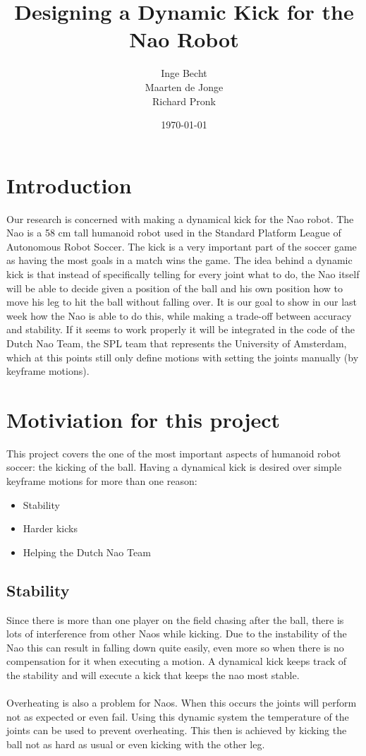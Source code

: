 \documentclass[a4paper]{article}
\begin{document}
\title{Designing a Dynamic Kick for the Nao Robot}
\author{Inge Becht \\ Maarten de Jonge \\ Richard Pronk}
\date{\today}
\maketitle

\section{Introduction}
Our research is concerned with making a dynamical kick for the Nao robot. The
Nao is a 58 cm tall humanoid robot used in the Standard Platform League of
Autonomous Robot Soccer. The kick is a very important part of the soccer game as
having the most goals in a match wins the game. The idea behind a dynamic kick
is that instead of specifically telling for every joint what to do, the Nao
itself will be able to decide given a position of the ball and his own position
how to move his leg to hit the ball without falling over. It is our goal to show
in our last week how the Nao is able to do this, while making a trade-off
between accuracy and stability. If it seems to work properly it will be
integrated in the code of the Dutch Nao Team, the SPL team that represents the
University of Amsterdam, which at this points still only 
define motions with setting the 
joints manually (by keyframe motions).

\section{Motiviation for this project} 
This project covers the one of the most important aspects of humanoid
robot soccer: the kicking of the ball.
Having a dynamical kick is desired over simple keyframe motions for more than one reason:

\begin{itemize}
    \item Stability
    \item Harder kicks
    \item Helping the Dutch Nao Team
\end{itemize}

\subsection{Stability}
Since there is more than one player on
the field  chasing after the ball,
there is lots of interference from other Naos while kicking. Due to the
instability of the Nao this can result in falling down quite easily, even more
so when there is no compensation for it when executing a motion. A dynamical
kick keeps track of the stability and will execute a kick that keeps the nao
most stable.
\\\\
Overheating is also a problem for Naos. When this occurs the joints will perform
not as expected or even fail. Using this dynamic system the temperature of the
joints can be used to prevent overheating. This then is achieved by kicking the ball
not as hard as usual or even kicking with the other leg. 
\end{document}
